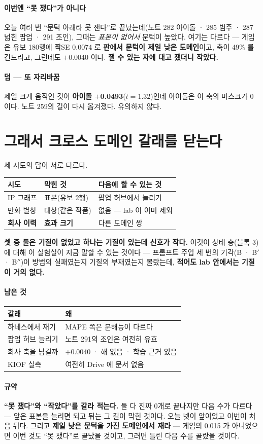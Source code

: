 \documentclass[10pt]{article}
\begin{document}
\paragraph{이번엔 ``못 쟀다''가 아니다} 오늘 여러 번 ``문턱 아래라 못 잰다''로
끝났는데(노트 282 아이돌 · 285 범주 · 287 넓힌 팝업 · 291 조인), 그때는
\emph{표본이 없어서} 문턱이 높았다. 여기는 다르다 --- 게임은 유보 180행에
짝SE 0.0074 로 \textbf{판에서 문턱이 제일 낮은 도메인}이고, 축이 49\% 를
건드리고, 그런데도 $+$0.0040 이다. \textbf{잴 수 있는 자에 대고 쟀더니 작았다.}

\paragraph{덤 --- 또 자리바꿈} 제일 크게 움직인 것이 \textbf{아이돌
$+$0.0493}($t{=}1.32$)인데 아이돌은 이 축의 마스크가 0 이다. 노트 259의
길이 다시 옮겨졌다. 유의하지 않다.

\section{그래서 크로스 도메인 갈래를 닫는다}

세 시도의 답이 서로 다르다.

\begin{center}\small
\begin{tabular}{lll}
\hline
시도 & 막힌 것 & 다음에 할 수 있는 것 \\
\hline
IP 그래프 & 표본(유보 2행) & 팝업 허브에서 늘리기 \\
만화 별칭 & 대상(같은 작품) & 없음 --- lab 이 이미 제외 \\
\textbf{회사 이력} & \textbf{효과 크기} & 다른 도메인 쌍 \\
\hline
\end{tabular}
\end{center}

\textbf{셋 중 둘은 기질이 없었고 하나는 기질이 있는데 신호가 작다.} 이것이
상태 층(블록 3)에 대해 이 실험실이 지금 말할 수 있는 것이다 --- 프롬프트 주입
세 번의 기각(B · B$'$ · B$''$)이 방법의 실패였는지 기질의 부재였는지 몰랐는데,
\textbf{적어도 lab 안에서는 기질이 거의 없다.}

\paragraph{남은 것}
\begin{center}\small
\begin{tabular}{ll}
\hline
갈래 & 왜 \\
\hline
하네스에서 재기 & MAPE 쪽은 분해능이 다르다 \\
팝업 허브 늘리기 & 노트 291의 조인은 여전히 유효 \\
회사 축을 남길까 & $+$0.0040 · 해 없음 · 학습 근거 있음 \\
KIOF 실측 & 여전히 Drive 에 문서 없음 \\
\hline
\end{tabular}
\end{center}

\paragraph{규약} \textbf{``못 쟀다''와 ``작았다''를 갈라 적는다.} 둘 다 진짜
0개로 끝나지만 다음 수가 다르다 --- 앞은 표본을 늘리면 되고 뒤는 그 길이
막힌 것이다. 오늘 넷이 앞이었고 이번이 처음 뒤다. 그리고 \textbf{제일 낮은
문턱을 가진 도메인에서 재라} --- 게임의 0.015 가 아니었으면 이번 것도
``못 쟀다''로 끝났을 것이고, 그러면 틀린 다음 수를 골랐을 것이다.
\end{document}
